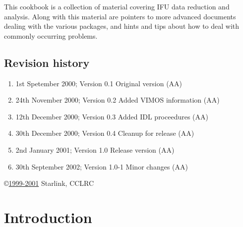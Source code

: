 \documentclass[twoside,11pt]{article}
\newcommand{\stardocinitials}  {SC}
\newcommand{\stardocnumber}    {16.1-1}
\newcommand{\stardocabstract}
{This cookbook is a collection of material covering IFU data reduction and analysis. Along with this material are pointers to more advanced documents dealing with the various packages, and hints and tips about how to deal with commonly occurring problems.}
\newcommand{\stardocname}{\stardocinitials /\stardocnumber}
\newenvironment{latexonly}{}{}
\newcommand{\xlabel}[1]{}
\newcommand{\latexonlytoc}[0]{\tableofcontents}
\renewcommand{\thepage}{\roman{page}}
\begin{document}
\stardocabstract
 \newpage
 \vspace{3cm}

 \subsection*{Revision history}

 \begin{enumerate}
   \item 1st Spetember 2000; Version 0.1 Original version (AA) 
   \item 24th November 2000; Version 0.2 Added VIMOS information (AA)
   \item 12th December 2000; Version 0.3 Added IDL proceedures (AA)
   \item 30th December 2000; Version 0.4 Cleanup for release (AA)
   \item 2nd January 2001; Version 1.0 Release version (AA)
   \item 30th September 2002; Version 1.0-1 Minor changes (AA)

 \end{enumerate}

 \vspace{10cm}
 \copyright \underline{1999-2001} Starlink, CCLRC

 \cleardoublepage
 \begin{latexonly}
   \setlength{\parskip}{0mm}
   \latexonlytoc

   \newpage
   \listoffigures

   \setlength{\parskip}{\medskipamount}
   \markright{\stardocname}
 \end{latexonly}

\cleardoublepage
\newpage
\renewcommand{\thepage}{\arabic{page}}
\setcounter{page}{1}


\section{\xlabel{sc16_intro}Introduction\label{sc16_intro}}
\end{document}
